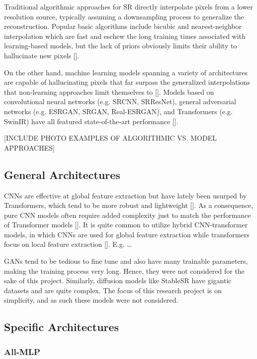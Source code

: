\documentclass{article}
\begin{document}
Traditional algorithmic approaches for SR directly interpolate pixels from a lower resolution source, typically assuming a downsampling process to generalize the reconstruction. Popular basic algorithms include bicubic and nearest-neighbor interpolation which are fast and eschew the long training times associated with learning-based models, but the lack of priors obviously limits their ability to hallucinate new pixels [].

On the other hand, machine learning models spanning a variety of architectures are capable of hallucinating pixels that far surpass the generalized interpolations that non-learning approaches limit themselves to []. Models based on convolutional neural networks (e.g. SRCNN, SRResNet), general adversarial networks (e.g. ESRGAN, SRGAN, Real-ESRGAN), and Transformers (e.g. SwinIR) have all featured state-of-the-art performance [].

[INCLUDE PHOTO EXAMPLES OF ALGORITHMIC VS. MODEL APPROACHES]

\subsection{General Architectures}

CNNs are effective at global feature extraction but have lately been usurped by Transformers, which tend to be more robust and lightweight []. As a consequence, pure CNN models often require added complexity just to match the performance of Transformer models []. It is quite common to utilize hybrid CNN-transformer models, in which CNNs are used for global feature extraction while transformers focus on local feature extraction []. E.g. …

GANs tend to be tedious to fine tune and also have many trainable parameters, making the training process very long. Hence, they were not considered for the sake of this project. Similarly, diffusion models like StableSR have gigantic datasets and are quite complex. The focus of this research project is on simplicity, and as such these models were not considered.

\subsection{Specific Architectures}

\subsubsection{All-MLP}
\end{document}

